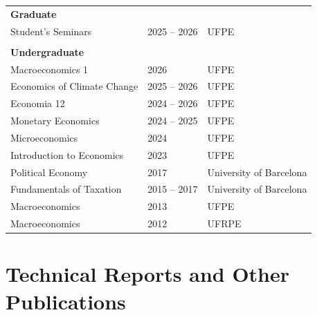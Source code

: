 \documentclass[a4paper,9pt]{article}
\begin{document}
\begin{flushleft}
\begin{tabular}{lll}
\multicolumn{3}{l}{\textbf{Graduate}} \\
Student's Seminars & 2025 -- 2026 & UFPE \\
\\
\multicolumn{3}{l}{\textbf{Undergraduate}} \\
Macroeconomics 1 & 2026 & UFPE \\
Economics of Climate Change & 2025 -- 2026 & UFPE \\
Economia 12 & 2024 -- 2026 & UFPE \\
Monetary Economics & 2024 -- 2025 & UFPE \\
Microeconomics & 2024 & UFPE \\
Introduction to Economics & 2023 & UFPE \\
Political Economy & 2017 & University of Barcelona \\
Fundamentals of Taxation & 2015 -- 2017 & University of Barcelona \\
Macroeconomics & 2013 & UFPE \\
Macroeconomics & 2012 & UFRPE \\
\end{tabular}
\end{flushleft}

\vspace*{0.1mm}

\section*{Technical Reports and Other Publications}
\end{document}
